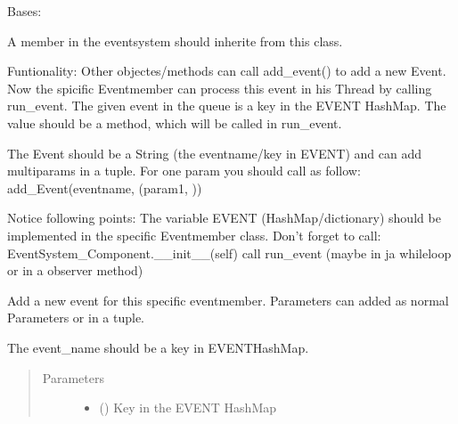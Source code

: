 \documentclass[letterpaper,10pt,english]{sphinxmanual}
\begin{document}
\begin{fulllineitems}
\label{\detokenize{anoog.automation:anoog.automation.event.Eventsystem_Component}}
\sphinxAtStartPar
Bases: 

\sphinxAtStartPar
A member in the eventsystem should inherite from this class.

\sphinxAtStartPar
Funtionality:
Other objectes/methods can call add\_event() to add a new Event. Now the spicific Eventmember
can process this event in his Thread by calling run\_event. The given event in the queue is
a key in the EVENT HashMap. The value should be a method, which will be called in run\_event.

\sphinxAtStartPar
The Event should be a String (the eventname/key in EVENT) and can add multi\sphinxhyphen{}params in a tuple.
For one param you should call as follow: add\_Event(eventname, (param1, ))

\sphinxAtStartPar
Notice following points:
\sphinxhyphen{} The variable EVENT (HashMap/dictionary) should be implemented in the specific Eventmember class.
\sphinxhyphen{} Don’t forget to call: EventSystem\_Component.\_\_init\_\_(self)
\sphinxhyphen{} call run\_event (maybe in ja while\sphinxhyphen{}loop or in a observer method)

\begin{fulllineitems}
\label{\detokenize{anoog.automation:anoog.automation.event.Eventsystem_Component.add_event}}
\sphinxAtStartPar
Add a new event for this specific eventmember.
Parameters can added as normal Parameters or in a tuple.

\sphinxAtStartPar
The event\_name should be a key in EVENT\sphinxhyphen{}HashMap.
\begin{quote}\begin{description}
\item[{Parameters}] \leavevmode\begin{itemize}
\item {} 
\sphinxAtStartPar
{} () \textendash{} Key in the EVENT HashMap


\end{itemize}
\end{description}
\end{quote}
\end{fulllineitems}
\end{fulllineitems}
\end{document}
